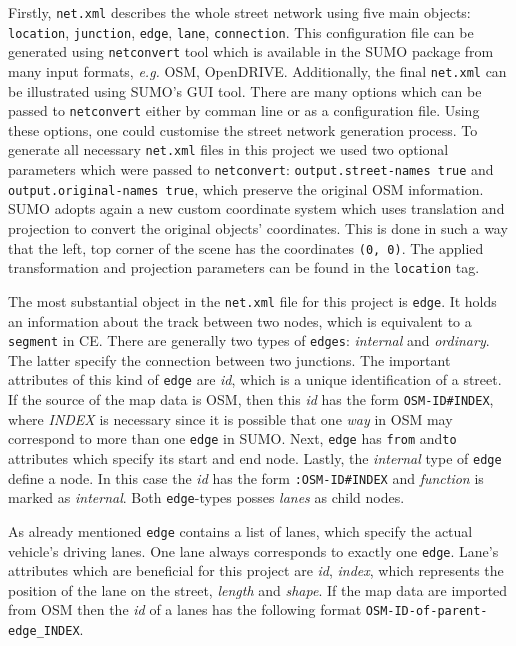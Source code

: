 Firstly, \texttt{net.xml} describes the whole street network using five main objects: \texttt{location}, \texttt{junction}, \texttt{edge}, \texttt{lane}, \texttt{connection}. This configuration file can be generated using \texttt{netconvert} tool which is available in the SUMO package from many input formats, \emph{e.g.} OSM, OpenDRIVE. Additionally, the final \texttt{net.xml} can be illustrated using SUMO's GUI tool. There are many options which can be passed to \texttt{netconvert} either by comman line or as a configuration file. Using these options, one could customise the street network generation process. To generate all necessary \texttt{net.xml} files in this project we used two optional parameters which were passed to \texttt{netconvert}: \texttt{output.street-names true} and \texttt{output.original-names true}, which preserve the original OSM information. SUMO adopts again a new custom coordinate system which uses translation and projection to convert the original objects' coordinates. This is done in such a way that the left, top corner of the scene has the coordinates \texttt{(0, 0)}. The applied transformation and projection parameters can be found in the \texttt{location} tag.

The most substantial object in the \texttt{net.xml} file for this project is \texttt{edge}. It holds an information about the track between two nodes, which is equivalent to a \texttt{segment} in CE. There are generally two types of \texttt{edges}: \emph{internal} and \emph{ordinary}. The latter specify the connection between two junctions. The important attributes of this kind of \texttt{edge} are \emph{id}, which is a unique identification of a street. If the source of the map data is OSM, then this \emph{id} has the form \texttt{OSM-ID\#INDEX}, where \emph{INDEX} is necessary since it is possible that one \emph{way} in OSM may correspond to more than one \texttt{edge} in SUMO. Next, \texttt{edge} has \texttt{from} and\texttt{to} attributes which specify its start and end node. Lastly, the \emph{internal} type of \texttt{edge} define a node. In this case the \emph{id} has the form \texttt{:OSM-ID\#INDEX} and \emph{function} is marked as \emph{internal}. Both \texttt{edge}-types posses \emph{lanes} as child nodes.

As already mentioned \texttt{edge} contains a list of lanes, which specify the actual vehicle's driving lanes. One lane always corresponds to exactly one \texttt{edge}. Lane's attributes which are beneficial for this project are \emph{id}, \emph{index}, which represents the position of the lane on the street, \emph{length} and \emph{shape}. If the map data are imported from OSM then the \emph{id} of a lanes has the following format \texttt{OSM-ID-of-parent-edge\_INDEX}. 

